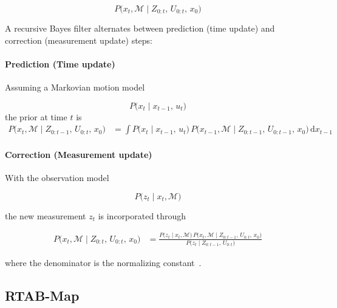 \begin{equation}
  P\bigl(x_t,\mathcal{M} \mid Z_{0:t},\,U_{0:t},\,x_0\bigr)
  \label{eq:joint-posterior}
\end{equation}

A recursive Bayes filter alternates between prediction (time update) and correction (measurement update) steps:

\paragraph*{Prediction (Time update)}

Assuming a Markovian motion model

\begin{equation}
  P\bigl(x_t\mid x_{t-1},\,u_t\bigr)
  \label{eq:motion-model}
\end{equation}
the prior at time $t$ is
\begin{align}
  P\bigl(x_t,\mathcal{M} \mid Z_{0:t-1},\,U_{0:t},\,x_0\bigr)
   & = \int
  P\bigl(x_t\mid x_{t-1},\,u_t\bigr)\,
  P\bigl(x_{t-1},\mathcal{M} \mid Z_{0:t-1},\,U_{0:t-1},\,x_0\bigr)
  \,\mathrm{d}x_{t-1}
  \label{eq:time-update}
\end{align}

\paragraph*{Correction (Measurement update)}
With the observation model

\begin{equation}
  P\bigl(z_t\mid x_t,\mathcal{M}\bigr)
  \label{eq:obs-model}
\end{equation}

the new measurement $z_t$ is incorporated through

\begin{align}
  P\bigl(x_t,\mathcal{M} \mid Z_{0:t},\,U_{0:t},\,x_0\bigr)
   & = \frac{P\bigl(z_t\mid x_t,\mathcal{M}\bigr)\,
    P\bigl(x_t,\mathcal{M} \mid Z_{0:t-1},\,U_{0:t},\,x_0\bigr)}
  {P\bigl(z_t\mid Z_{0:t-1},\,U_{0:t}\bigr)}
  \label{eq:meas-update}
\end{align}

where the denominator is the normalizing constant~\cite{1638022}.

\subsection{RTAB-Map}\label{subsec:rtabmap}


